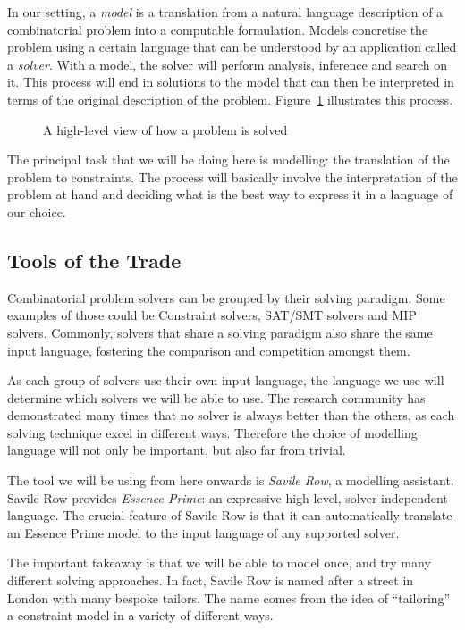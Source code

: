 In our setting, a \emph{model} is a translation from a natural language
description of a combinatorial problem into a computable formulation. Models
concretise the problem using a certain language that can be understood by an
application called a \emph{solver}. 
With a model, the solver will perform
analysis, inference and search on it. This process will end in solutions to the
model that can then be interpreted in terms of the original description of the
problem. Figure~\ref{fig-modelling} illustrates this process.

\begin{figure}
    \centering
    
    \label{fig-modelling}
    \caption{A high-level view of how a problem is solved}
\end{figure}

The principal task that we will be doing here is modelling: the translation of
the problem to constraints. The process will basically involve the
interpretation of the problem at hand and deciding what is the best way to
express it in a language of our choice.

\subsection{Tools of the Trade}

Combinatorial problem solvers can be grouped by their solving paradigm. Some
examples of those could be Constraint solvers, SAT/SMT solvers and MIP solvers.
Commonly, solvers that share a solving paradigm also share the same input
language, fostering the comparison and competition amongst them. 

As each group of solvers use their own input language, the language we use will
determine which solvers we will be able to use.
The research community has demonstrated many times that no solver is
always better than the others, as each solving technique excel in different
ways. Therefore the choice of modelling language will not only be important, but
also far from trivial.

The tool we will be using from here onwards is \emph{Savile Row}, a modelling
assistant. Savile Row provides \emph{Essence Prime}: an expressive high-level,
solver-independent language. The crucial feature of Savile Row is that it can
automatically translate an Essence Prime model to the input language of any
supported solver. 

The important takeaway is that we will be able to model once, and try many
different solving approaches.  In fact, Savile Row is named after a street in
London with many bespoke tailors. The name comes from the idea of ``tailoring''
a constraint model in a variety of different ways.

